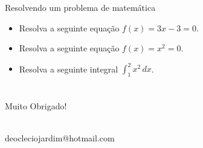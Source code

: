 \documentclass{beamer}
\begin{document}
\begin{frame}{Resolvendo um problema de matemática}
\begin{itemize}\itemsep=1cm
    \item Resolva a seguinte equação $f(x)=3x-3=0$.
    \pause
    \item Resolva a seguinte equação $f(x)=x^2=0$.
    \item Resolva a seguinte integral $\int_{1}^{2} x^2 \, dx
$.
\end{itemize}
\end{frame}


\section*{}
\begin{frame}
\begin{center}
\begin{huge}
Muito Obrigado! 
\end{huge} \\
\faEnvelope\space deocleciojardim@hotmail.com 
\end{center}
\hyperlink{pgini}{}
\end{frame}
\end{document}
